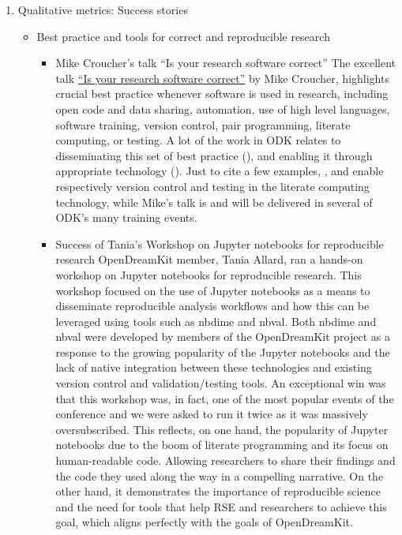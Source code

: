 \begin{enumerate}
\item Qualitative metrics: Success stories
\begin{itemize}
\item Best practice and tools for correct and reproducible research
 \begin{itemize}       
\item Mike Croucher's talk ``Is your research software correct''
 The excellent talk \href{https://mikecroucher.github.io/MLPM_talk/}{``Is your research software correct''} by Mike 
 Croucher, highlights crucial best practice whenever software is used in research, including open code and data sharing, 
 automation, use of high level languages, software training, version control, pair programming, literate computing, or testing. A 
 lot of the work in ODK relates to disseminating this set of best practice (), and enabling it through appropriate 
 technology ().  Just to cite a few examples, , and  
 enable respectively version control and testing in the \Jupyter literate computing technology, while Mike's talk is and will be 
 delivered in several of ODK's many training events.
         
  \item Success of Tania's Workshop on Jupyter notebooks for reproducible research
  OpenDreamKit member, Tania Allard, ran a hands-on workshop on Jupyter notebooks for reproducible research. This workshop focused on 
  the use of Jupyter notebooks as a means to disseminate reproducible analysis workflows and how this can be leveraged using tools 
  such as nbdime and nbval. Both nbdime and nbval were developed by members of the OpenDreamKit project as a response to the growing 
  popularity of the Jupyter notebooks and the lack of native integration between these technologies and existing version control and 
  validation/testing tools.
  An exceptional win was that this workshop was, in fact, one of the most popular events of the conference and we were asked to run 
  it twice as it was massively oversubscribed. This reflects, on one hand, the popularity of Jupyter notebooks due to the boom of 
  literate programming and its focus on human-readable code. Allowing researchers to share their findings and the code they used 
  along the way in a compelling narrative. On the other hand, it demonstrates the importance of reproducible science and the need for 
  tools that help RSE and researchers to achieve this goal, which aligns perfectly with the goals of OpenDreamKit.


\end{itemize}
\end{itemize}
\end{enumerate}
